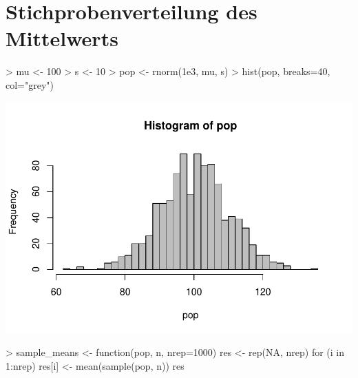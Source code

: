 
\renewenvironment{Schunk}{\vspace{10pt}}{\vspace{8pt}}   

\section{Stichprobenverteilung des Mittelwerts}

\begin{Schunk}
\begin{Sinput}
> mu <- 100
> s <- 10
> pop <- rnorm(1e3, mu, s)
> hist(pop, breaks=40, col="grey")
\end{Sinput}
\end{Schunk}
\includegraphics{sim_mean_dist-002}


\begin{Schunk}
\begin{Sinput}
> sample_means <- function(pop, n, nrep=1000){
   res <- rep(NA, nrep)
   for (i in 1:nrep)
     res[i] <- mean(sample(pop, n))  
   res
 }
\end{Sinput}
\end{Schunk}

